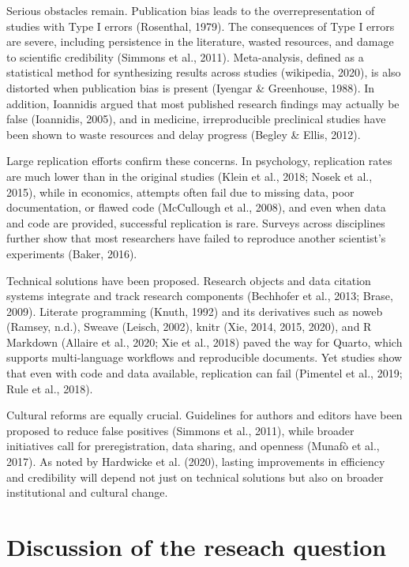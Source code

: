 \documentclass[
  a4paper,
]{article}
\begin{document}
Serious obstacles remain. Publication bias leads to the
overrepresentation of studies with Type I errors (Rosenthal, 1979). The
consequences of Type I errors are severe, including persistence in the
literature, wasted resources, and damage to scientific credibility
(Simmons et al., 2011). Meta-analysis, defined as a statistical method
for synthesizing results across studies (wikipedia, 2020), is also
distorted when publication bias is present (Iyengar \& Greenhouse,
1988). In addition, Ioannidis argued that most published research
findings may actually be false (Ioannidis, 2005), and in medicine,
irreproducible preclinical studies have been shown to waste resources
and delay progress (Begley \& Ellis, 2012).

Large replication efforts confirm these concerns. In psychology,
replication rates are much lower than in the original studies (Klein et
al., 2018; Nosek et al., 2015), while in economics, attempts often fail
due to missing data, poor documentation, or flawed code (McCullough et
al., 2008), and even when data and code are provided, successful
replication is rare. Surveys across disciplines further show that most
researchers have failed to reproduce another scientist's experiments
(Baker, 2016).

Technical solutions have been proposed. Research objects and data
citation systems integrate and track research components (Bechhofer et
al., 2013; Brase, 2009). Literate programming (Knuth, 1992) and its
derivatives such as noweb (Ramsey, n.d.), Sweave (Leisch, 2002), knitr
(Xie, 2014, 2015, 2020), and R Markdown (Allaire et al., 2020; Xie et
al., 2018) paved the way for Quarto, which supports multi-language
workflows and reproducible documents. Yet studies show that even with
code and data available, replication can fail (Pimentel et al., 2019;
Rule et al., 2018).

Cultural reforms are equally crucial. Guidelines for authors and editors
have been proposed to reduce false positives (Simmons et al., 2011),
while broader initiatives call for preregistration, data sharing, and
openness (Munafò et al., 2017). As noted by Hardwicke et al. (2020),
lasting improvements in efficiency and credibility will depend not just
on technical solutions but also on broader institutional and cultural
change.

\section{Discussion of the reseach
question}\label{discussion-of-the-reseach-question}
\end{document}
